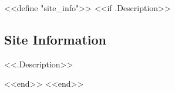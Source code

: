 <<define "site_info">>
<<if .Description>>
\subsection*{Site Information}
<<.Description>>
\par
<<end>>
<<end>>
